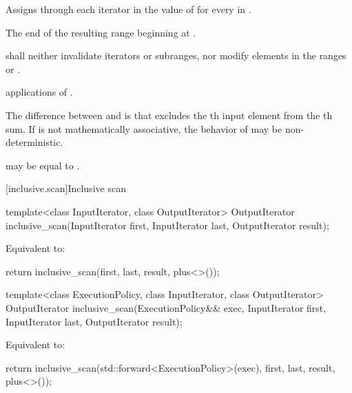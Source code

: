 \begin{itemdescr}
\pnum
\effects
Assigns through each iterator  in  the value of
for every  in .

\pnum
\returns
The end of the resulting range beginning at .

\pnum
\requires
{} shall neither invalidate iterators or subranges, nor modify
elements in the
ranges  or .

\pnum
\complexity
{} applications of .

\pnum
\realnotes
The difference between  and  is
that  excludes the th input element from the
th sum. If  is not mathematically associative, the
behavior of  may be non-deterministic.

\pnum
\remarks
{} may be equal to .
\end{itemdescr}

[inclusive.scan]{Inclusive scan}

%
\begin{itemdecl}
template<class InputIterator, class OutputIterator>
  OutputIterator inclusive_scan(InputIterator first, InputIterator last,
                                OutputIterator result);
\end{itemdecl}

\begin{itemdescr}
\pnum
\effects Equivalent to:
\begin{codeblock}
return inclusive_scan(first, last, result, plus<>());
\end{codeblock}
\end{itemdescr}

%
\begin{itemdecl}
template<class ExecutionPolicy, class InputIterator, class OutputIterator>
  OutputIterator inclusive_scan(ExecutionPolicy&& exec,
                                InputIterator first, InputIterator last,
                                OutputIterator result);
\end{itemdecl}

\begin{itemdescr}
\pnum
\effects Equivalent to:
\begin{codeblock}
return inclusive_scan(std::forward<ExecutionPolicy>(exec), first, last, result, plus<>());
\end{codeblock}
\end{itemdescr}


